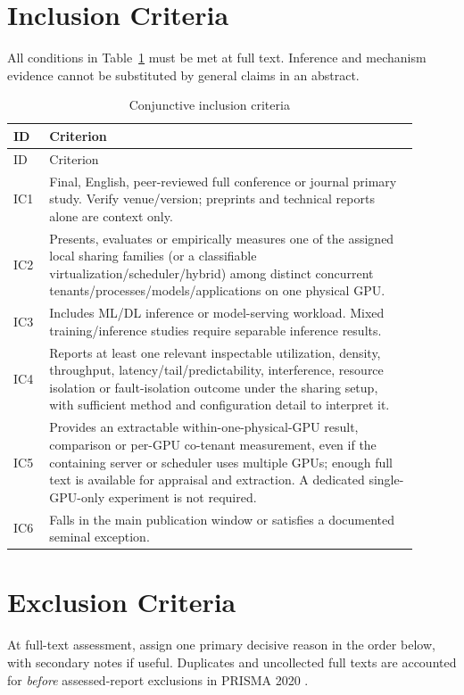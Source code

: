 \documentclass[12pt,a4paper]{article}
\begin{document}
\section{Inclusion Criteria}\label{sec:inclusion}
All conditions in Table~\ref{tab:ic} must be met at full text. Inference and mechanism evidence cannot be substituted by general claims in an abstract.

\begin{longtable}{p{0.08\linewidth}p{0.82\linewidth}}
\caption{Conjunctive inclusion criteria}\label{tab:ic}\\\toprule ID & Criterion\\\midrule\endfirsthead
\toprule ID & Criterion\\\midrule\endhead
IC1 & Final, English, peer-reviewed full conference or journal primary study. Verify venue/version; preprints and technical reports alone are context only.\\
IC2 & Presents, evaluates or empirically measures one of the assigned local sharing families (or a classifiable virtualization/scheduler/hybrid) among distinct concurrent tenants/processes/models/applications on one physical GPU.\\
IC3 & Includes ML/DL inference or model-serving workload. Mixed training/inference studies require separable inference results.\\
IC4 & Reports at least one relevant inspectable utilization, density, throughput, latency/tail/predictability, interference, resource isolation or fault-isolation outcome under the sharing setup, with sufficient method and configuration detail to interpret it.\\
IC5 & Provides an extractable within-one-physical-GPU result, comparison or per-GPU co-tenant measurement, even if the containing server or scheduler uses multiple GPUs; enough full text is available for appraisal and extraction. A dedicated single-GPU-only experiment is not required.\\
IC6 & Falls in the main publication window or satisfies a documented seminal exception.\\\bottomrule
\end{longtable}

\section{Exclusion Criteria}
At full-text assessment, assign one primary decisive reason in the order below, with secondary notes if useful. Duplicates and uncollected full texts are accounted for \emph{before} assessed-report exclusions in PRISMA 2020 \cite{prisma}.
\end{document}
